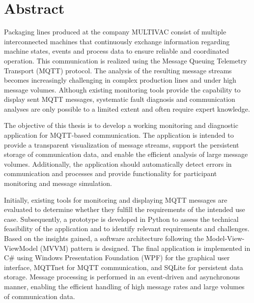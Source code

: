 \chapter*{Abstract} %
Packaging lines produced at the company MULTIVAC consist of multiple interconnected machines that continuously exchange information regarding machine states, events and process data to ensure reliable and coordinated operation. This communication is realized using the Message Queuing Telemetry Transport (MQTT) protocol. The analysis of the resulting message streams becomes increasingly challenging in complex production lines and under high message volumes. Although existing monitoring tools provide the capability to display sent MQTT messages, systematic fault diagnosis and communication analyses are only possible to a limited extent and often require expert knowledge.

The objective of this thesis is to develop a working monitoring and diagnostic application for MQTT-based communication. The application is intended to provide a transparent visualization of message streams, support the persistent storage of communication data, and enable the efficient analysis of large message volumes. Additionally, the application should automatically detect errors in communication and processes and provide functionality for participant monitoring and message simulation.

Initially, existing tools for monitoring and displaying MQTT messages are evaluated to determine whether they fulfill the requirements of the intended use case. Subsequently, a prototype is developed in Python to assess the technical feasibility of the application and to identify relevant requirements and challenges. Based on the insights gained, a software architecture following the Model-View-ViewModel (MVVM) pattern is designed. The final application is implemented in C\# using Windows Presentation Foundation (WPF) for the graphical user interface, MQTTnet for MQTT communication, and SQLite for persistent data storage. Message processing is performed in an event-driven and asynchronous manner, enabling the efficient handling of high message rates and large volumes of communication data.

